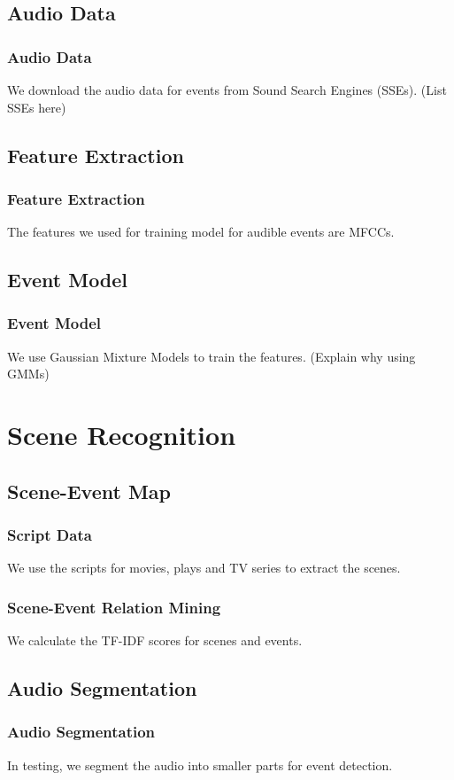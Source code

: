 \documentclass[xcolor=table,slidestop,compress,mathserif]{beamer}
\begin{document}
\subsection{Audio Data}
\begin{frame}
  \frametitle{Audio Data}	
	We download the audio data for events from Sound Search Engines (SSEs). 
	(List SSEs here)
\end{frame}
\subsection{Feature Extraction}
\begin{frame}
	\frametitle{Feature Extraction}
	The features we used for training model for audible events are MFCCs. 
\end{frame}
\subsection{Event Model}
\begin{frame}
	\frametitle{Event Model}	
	We use Gaussian Mixture Models to train the features. 
	(Explain why using GMMs)
\end{frame}
\section{Scene Recognition}
\subsection{Scene-Event Map}
\begin{frame}
	\frametitle{Script Data}	
	We use the scripts for movies, plays and TV series to extract the scenes. 
\end{frame}
\begin{frame}
	\frametitle{Scene-Event Relation Mining}
	We calculate the TF-IDF scores for scenes and events. 
\end{frame}
\subsection{Audio Segmentation}
\begin{frame}
	\frametitle{Audio Segmentation}	
	In testing, we segment the audio into smaller parts for event detection. 
\end{frame}
\end{document}
